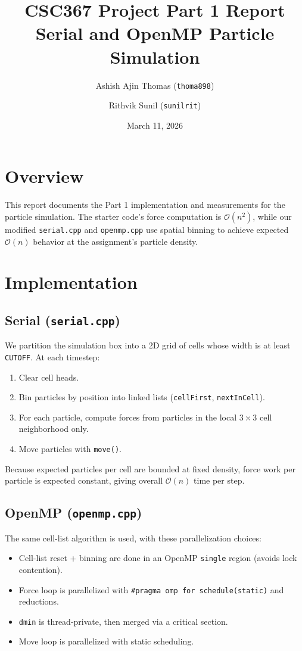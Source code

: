\documentclass[11pt]{article}
\title{CSC367 Project Part 1 Report\\Serial and OpenMP Particle Simulation}
\author{
  Ashish Ajin Thomas (\texttt{thoma898}) \and
  Rithvik Sunil (\texttt{sunilrit})
}
\date{March 11, 2026}
\begin{document}
\maketitle

\section{Overview}
This report documents the Part 1 implementation and measurements for the particle
simulation. The starter code's force computation is \(\mathcal{O}(n^2)\), while
our modified \texttt{serial.cpp} and \texttt{openmp.cpp} use spatial binning to
achieve expected \(\mathcal{O}(n)\) behavior at the assignment's particle density.

\section{Implementation}
\subsection{Serial (\texttt{serial.cpp})}
We partition the simulation box into a 2D grid of cells whose width is at least
\texttt{CUTOFF}. At each timestep:
\begin{enumerate}
  \item Clear cell heads.
  \item Bin particles by position into linked lists (\texttt{cellFirst}, \texttt{nextInCell}).
  \item For each particle, compute forces from particles in the local \(3\times3\) cell neighborhood only.
  \item Move particles with \texttt{move()}.
\end{enumerate}
Because expected particles per cell are bounded at fixed density, force work per
particle is expected constant, giving overall \(\mathcal{O}(n)\) time per step.

\subsection{OpenMP (\texttt{openmp.cpp})}
The same cell-list algorithm is used, with these parallelization choices:
\begin{itemize}
  \item Cell-list reset + binning are done in an OpenMP \texttt{single} region (avoids lock contention).
  \item Force loop is parallelized with \texttt{\#pragma omp for schedule(static)} and reductions.
  \item \texttt{dmin} is thread-private, then merged via a critical section.
  \item Move loop is parallelized with static scheduling.
\end{itemize}
\end{document}
